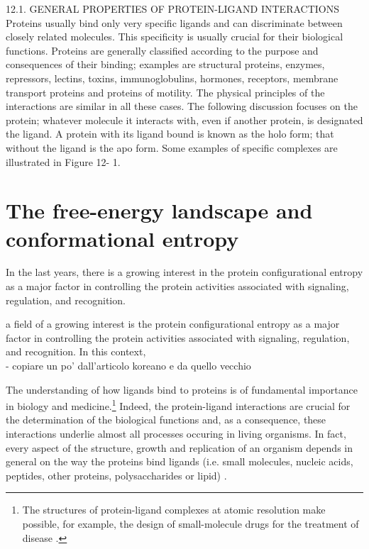 12.1. GENERAL PROPERTIES OF PROTEIN-LIGAND INTERACTIONS
Proteins usually bind only very specific ligands and can discriminate between closely related
molecules. This specificity is usually crucial for their biological functions. Proteins are generally
classified according to the purpose and consequences of their binding; examples are structural
proteins, enzymes, repressors, lectins, toxins, immunoglobulins, hormones, receptors, membrane
transport proteins and proteins of motility. The physical principles of the interactions are similar in
all these cases. The following discussion focuses on the protein; whatever molecule it interacts with,
even if another protein, is designated the ligand. A protein with its ligand bound is known as the holo
form; that without the ligand is the apo form. Some examples of specific complexes are illustrated in
Figure 12- 1.
\cite{creighton2010biophysical}

\newpage

\section{The free-energy landscape and conformational entropy}\label{sec:configurational-entropy}

In the last years, there is a growing interest in the protein configurational entropy as a major factor in controlling the protein activities associated with signaling, regulation, and recognition.

a field of a growing interest is the protein configurational entropy as a major factor in controlling the protein activities associated with signaling, regulation, and recognition.
In this context, \\
- copiare un po' dall'articolo koreano e da quello vecchio

\newpage

The understanding of how ligands bind to proteins is of fundamental importance in biology and medicine.\footnote{The structures of protein-ligand complexes at atomic resolution make possible, for example, the design of small-molecule drugs for the treatment of disease \cite{dunn2001protein}.} Indeed, the protein-ligand interactions are crucial for the determination of the biological functions and, as a consequence, these interactions underlie almost all processes occuring in living organisms. In fact, every aspect of the structure, growth and replication of an organism depends in general on the way the proteins bind ligands (i.e. small molecules, nucleic acids, peptides, other proteins, polysaccharides or lipid) \cite{creighton2010biophysical}.

